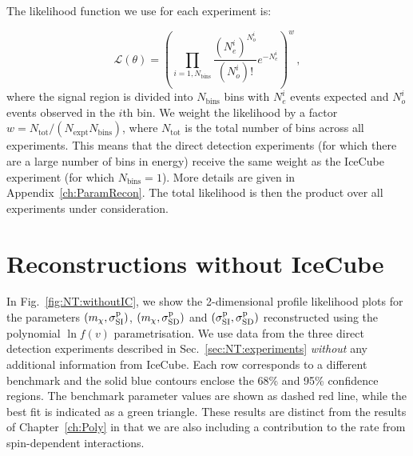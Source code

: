 The likelihood function we use for each experiment is:

\begin{equation}
\mathcal{L}(\theta) = \left(\prod_{i = 1, N_\textrm{bins}} \frac{(N_e^i)^{N_o^i}}{(N_o^i)!}e^{-N_e^i}\right)^{w}\,,
\end{equation}
where the signal region is divided into $N_\textrm{bins}$ bins with $N_e^i$ events expected and $N_o^i$ events observed in the $i$th bin. We weight the likelihood by a factor $w = N_\textrm{tot}/(N_\textrm{expt}N_\textrm{bins})$, where $N_\textrm{tot}$ is the total number of bins across all experiments. This means that the direct detection experiments (for which there are a large number of bins in energy) receive the same weight as the IceCube experiment (for which $N_\textrm{bins} = 1$). More details are given in Appendix~\ref{ch:ParamRecon}. The total likelihood is then the product over all experiments under consideration.

\section{Reconstructions without IceCube}
\label{sec:NT:withoutIC}

In Fig.~\ref{fig:NT:withoutIC}, we show the 2-dimensional profile likelihood plots for the parameters $(m_\chi, \sigmapsi)$, $(m_\chi, \sigmapsd)$ and $(\sigmapsi, \sigmapsd)$ reconstructed using the polynomial $\ln f(v)$ parametrisation. We use data from the three direct detection experiments described in Sec.~\ref{sec:NT:experiments} \textit{without} any additional information from IceCube. Each row corresponds to a different benchmark and the solid blue contours enclose the 68\% and 95\% confidence regions. The benchmark parameter values are shown as dashed red line, while the best fit is indicated as a green triangle. These results are distinct from the results of Chapter~\ref{ch:Poly} in that we are also including a contribution to the rate from spin-dependent interactions.


